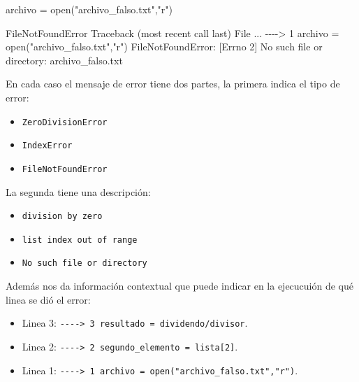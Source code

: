 \documentclass[
  letterpaper,
  DIV=11,
  numbers=noendperiod]{scrreprt}
\newenvironment{Shaded}{\begin{snugshade}}{\end{snugshade}}
\newcommand{\BuiltInTok}[1]{\textcolor[rgb]{0.00,0.23,0.31}{#1}}
\newcommand{\ErrorTok}[1]{\textcolor[rgb]{0.68,0.00,0.00}{#1}}
\newcommand{\ExtensionTok}[1]{\textcolor[rgb]{0.00,0.23,0.31}{#1}}
\newcommand{\KeywordTok}[1]{\textcolor[rgb]{0.00,0.23,0.31}{#1}}
\newcommand{\NormalTok}[1]{\textcolor[rgb]{0.00,0.23,0.31}{#1}}
\newcommand{\OperatorTok}[1]{\textcolor[rgb]{0.37,0.37,0.37}{#1}}
\newcommand{\StringTok}[1]{\textcolor[rgb]{0.13,0.47,0.30}{#1}}
\providecommand{\tightlist}{%
  \setlength{\itemsep}{0pt}\setlength{\parskip}{0pt}}\usepackage{longtable,booktabs,array}
\begin{document}
\begin{Shaded}
\begin{Highlighting}[]
\NormalTok{archivo }\OperatorTok{=} \BuiltInTok{open}\NormalTok{(}\StringTok{"archivo\_falso.txt"}\NormalTok{,}\StringTok{"r"}\NormalTok{)}
\end{Highlighting}
\end{Shaded}

\begin{Shaded}
\begin{Highlighting}[]
\ExtensionTok{FileNotFoundError}\NormalTok{                         Traceback }\ErrorTok{(}\ExtensionTok{most}\NormalTok{ recent call last}\KeywordTok{)}
\ExtensionTok{File}\NormalTok{ ...}
\ExtensionTok{{-}{-}{-}{-}}\OperatorTok{\textgreater{}}\NormalTok{ 1 archivo = open}\ErrorTok{(}\StringTok{"archivo\_falso.txt"}\ExtensionTok{,}\StringTok{"r"}\KeywordTok{)}
\ExtensionTok{FileNotFoundError:}\NormalTok{ [Errno 2] No such file or directory: }\StringTok{\textquotesingle{}archivo\_falso.txt\textquotesingle{}}
\end{Highlighting}
\end{Shaded}

En cada caso el mensaje de error tiene dos partes, la primera indica el
tipo de error:

\begin{itemize}
\tightlist
\item
  \texttt{ZeroDivisionError}
\item
  \texttt{IndexError}
\item
  \texttt{FileNotFoundError}
\end{itemize}

La segunda tiene una descripción:

\begin{itemize}
\tightlist
\item
  \texttt{division\ by\ zero}
\item
  \texttt{list\ index\ out\ of\ range}
\item
  \texttt{No\ such\ file\ or\ directory}
\end{itemize}

Además nos da información contextual que puede indicar en la ejecucuión
de qué linea se dió el error:

\begin{itemize}
\tightlist
\item
  Linea 3:
  \texttt{-\/-\/-\/-\textgreater{}\ 3\ resultado\ =\ dividendo/divisor}.
\item
  Linea 2:
  \texttt{-\/-\/-\/-\textgreater{}\ 2\ segundo\_elemento\ =\ lista{[}2{]}}.
\item
  Linea 1:
  \texttt{-\/-\/-\/-\textgreater{}\ 1\ archivo\ =\ open("archivo\_falso.txt","r")}.
\end{itemize}
\end{document}
